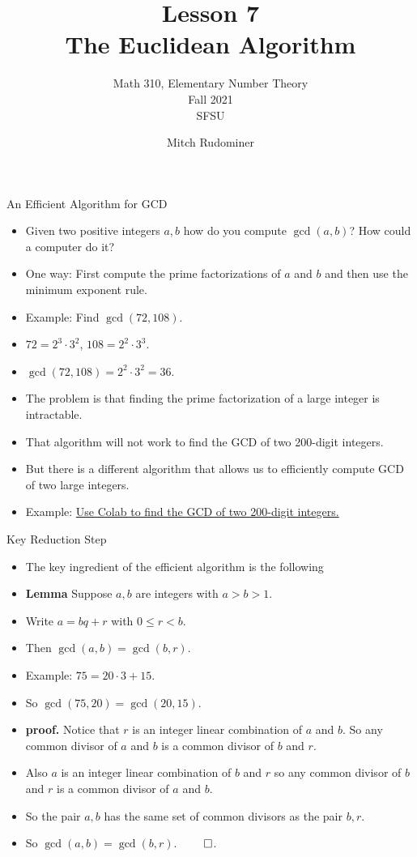 \documentclass{beamer}
\title{Lesson 7 \\ The Euclidean Algorithm}
\subtitle{Math 310, Elementary Number Theory \\ Fall 2021 \\ SFSU}
\author{Mitch Rudominer}
\date{}
\begin{document}
\begin{frame}
  \titlepage
\end{frame}

\begin{frame}{An Efficient Algorithm for GCD}

\begin{itemize}
  \item Given two positive integers $a,b$ how do you compute $\gcd(a,b)$? How could a computer do it?
  \item One way: First compute the prime factorizations of $a$ and $b$ and then use the minimum exponent rule.
  \item Example: Find $\gcd(72, 108)$.
  \item $72=2^3\cdot 3^2$, $108=2^2\cdot 3^3$.
  \item $\gcd(72,108) = 2^2\cdot 3^2 = 36$.
  \item The problem is that finding the prime factorization of a large integer is intractable.
  \item That algorithm will not work to find the GCD of two 200-digit integers.
  \item But there is a different algorithm that allows us to efficiently compute GCD of two large integers.
  \item Example: \href{https://colab.research.google.com/drive/1itrO4ePMS6PxUmBhbTBumrgoafyIglD7}{Use Colab to find the GCD of two 200-digit integers.}
\end{itemize}

\end{frame}

\begin{frame}{Key Reduction Step}

\begin{itemize}
  \item The key ingredient of the efficient algorithm is the following
  \item \textbf{Lemma} Suppose $a,b$ are integers with $a>b>1$.
  \item Write $a = bq + r$ with $0\leq r < b$.
  \item Then $\gcd(a,b) = \gcd(b,r)$.
  \item Example: $75 = 20\cdot 3 + 15$.
  \item So $\gcd(75, 20) = \gcd(20, 15)$.
  \item \textbf{proof.} Notice that $r$ is an integer linear combination of
  $a$ and $b$. So any common divisor of $a$ and $b$ is a common divisor of $b$ and $r$.
  \item Also $a$ is an integer linear combination of $b$ and $r$ so any common divisor
  of $b$ and $r$ is a common divisor of $a$ and $b$.
  \item So the pair $a,b$ has the same set of common divisors as the pair $b,r$.
  \item So $\gcd(a,b)=\gcd(b,r)$. $\qed$.
\end{itemize}

\end{frame}
\end{document}
